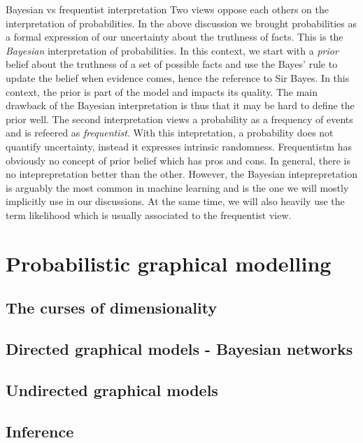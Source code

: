 \begin{side_note}{Bayesian vs frequentist interpretation}
  Two views oppose each others on the interpretation of probabilities. In the above discussion we brought probabilities as a formal expression of our uncertainty about the truthness of facts. This is the \textit{Bayesian} interpretation of probabilities. In this context, we start with a \textit{prior} belief about the truthness of a set of possible facts and use the Bayes' rule to update the belief when evidence comes, hence the reference to Sir Bayes. In this context, the prior is part of the model and impacts its quality. The main drawback of the Bayesian interpretation is thus that it may be hard to define the prior well. The second interpretation views a probability as a frequency of events and is refeered as \textit{frequentist}. With this intepretation, a probability does not quantify uncertainty, instead it expresses intrinsic randomness. Frequentistm has obviously no concept of prior belief which has pros and cons. In general, there is no inteprepretation better than the other. However, the Bayesian inteprepretation is arguably the most common in machine learning and is the one we will mostly implicitly use in our discussions. At the same time, we will also heavily use the term likelihood which is usually associated to the frequentist view.
\end{side_note}
\section{Probabilistic graphical modelling}

\subsection{The curses of dimensionality}

\subsection{Directed graphical models - Bayesian networks}

\subsection{Undirected graphical models}

\subsection{Inference}

